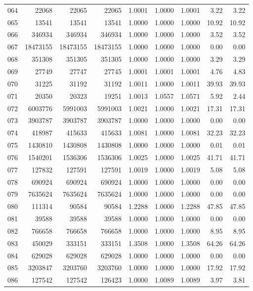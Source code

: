 \begin{longtable}{crrrrrrrr}
064 & 22068 & 22065 & 22065 & 1.0001 & 1.0000 & 1.0001 & 3.22 & 3.22 \\
065 & 13541 & 13541 & 13541 & 1.0000 & 1.0000 & 1.0000 & 10.92 & 10.92 \\
066 & 346934 & 346934 & 346934 & 1.0000 & 1.0000 & 1.0000 & 3.52 & 3.52 \\
067 & 18473155 & 18473155 & 18473155 & 1.0000 & 1.0000 & 1.0000 & 0.00 & 0.00 \\
068 & 351308 & 351305 & 351305 & 1.0000 & 1.0000 & 1.0000 & 3.29 & 3.29 \\
069 & 27749 & 27747 & 27745 & 1.0001 & 1.0001 & 1.0001 & 4.76 & 4.83 \\
070 & 31225 & 31192 & 31192 & 1.0011 & 1.0000 & 1.0011 & 39.93 & 39.93 \\
071 & 20350 & 20323 & 19251 & 1.0013 & 1.0557 & 1.0571 & 5.92 & 2.44 \\
072 & 6003776 & 5991003 & 5991003 & 1.0021 & 1.0000 & 1.0021 & 17.31 & 17.31 \\
073 & 3903787 & 3903787 & 3903787 & 1.0000 & 1.0000 & 1.0000 & 0.00 & 0.00 \\
074 & 418987 & 415633 & 415633 & 1.0081 & 1.0000 & 1.0081 & 32.23 & 32.23 \\
075 & 1430810 & 1430808 & 1430808 & 1.0000 & 1.0000 & 1.0000 & 0.01 & 0.01 \\
076 & 1540201 & 1536306 & 1536306 & 1.0025 & 1.0000 & 1.0025 & 41.71 & 41.71 \\
077 & 127832 & 127591 & 127591 & 1.0019 & 1.0000 & 1.0019 & 5.08 & 5.08 \\
078 & 690924 & 690924 & 690924 & 1.0000 & 1.0000 & 1.0000 & 0.00 & 0.00 \\
079 & 7635624 & 7635624 & 7635624 & 1.0000 & 1.0000 & 1.0000 & 0.00 & 0.00 \\
080 & 111314 & 90584 & 90584 & 1.2288 & 1.0000 & 1.2288 & 47.85 & 47.85 \\
081 & 39588 & 39588 & 39588 & 1.0000 & 1.0000 & 1.0000 & 0.00 & 0.00 \\
082 & 766658 & 766658 & 766658 & 1.0000 & 1.0000 & 1.0000 & 8.95 & 8.95 \\
083 & 450029 & 333151 & 333151 & 1.3508 & 1.0000 & 1.3508 & 64.26 & 64.26 \\
084 & 629028 & 629028 & 629028 & 1.0000 & 1.0000 & 1.0000 & 0.00 & 0.00 \\
085 & 3203847 & 3203760 & 3203760 & 1.0000 & 1.0000 & 1.0000 & 17.92 & 17.92 \\
086 & 127542 & 127542 & 126423 & 1.0000 & 1.0089 & 1.0089 & 3.97 & 3.81 \\

\end{longtable}
